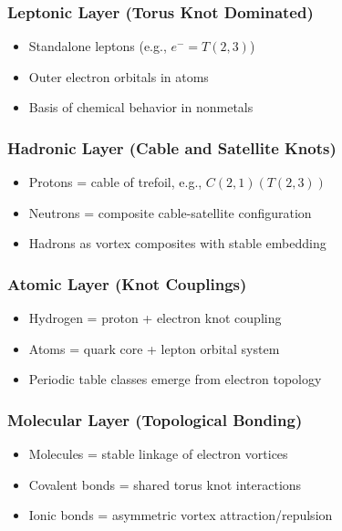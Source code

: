 \documentclass[12pt]{article}
\begin{document}
\subsubsection*{Leptonic Layer (Torus Knot Dominated)}
\begin{itemize}
    \item Standalone leptons (e.g., \( e^- = T(2,3) \))
    \item Outer electron orbitals in atoms
    \item Basis of chemical behavior in nonmetals
\end{itemize}

\subsubsection*{Hadronic Layer (Cable and Satellite Knots)}
\begin{itemize}
    \item Protons = cable of trefoil, e.g., \( C(2,1)(T(2,3)) \)
    \item Neutrons = composite cable-satellite configuration
    \item Hadrons as vortex composites with stable embedding
\end{itemize}

\subsubsection*{Atomic Layer (Knot Couplings)}
\begin{itemize}
    \item Hydrogen = proton + electron knot coupling
    \item Atoms = quark core + lepton orbital system
    \item Periodic table classes emerge from electron topology
\end{itemize}

\subsubsection*{Molecular Layer (Topological Bonding)}
\begin{itemize}
    \item Molecules = stable linkage of electron vortices
    \item Covalent bonds = shared torus knot interactions
    \item Ionic bonds = asymmetric vortex attraction/repulsion
\end{itemize}
\end{document}
